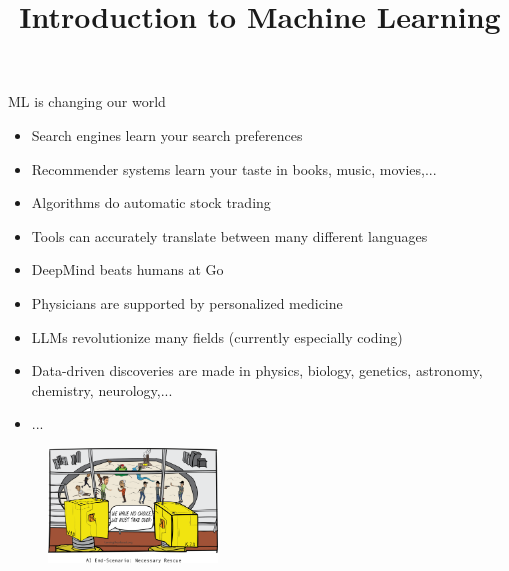 \documentclass[11pt,compress,t,notes=noshow, xcolor=table]{beamer}
\title{Introduction to Machine Learning}
\begin{document}


\begin{frame}{ML is changing our world}
  
  \begin{itemize}
    
    \item Search engines learn your search preferences
    
    \item Recommender systems learn your taste in books, music, movies,...
    
    \item Algorithms do automatic stock trading
    
    
    \item Tools can accurately translate between many different languages
    
    \item DeepMind beats humans at Go
    
    \item Physicians are supported by personalized medicine
    
    \item LLMs revolutionize many fields (currently especially coding)
    
    \item Data-driven discoveries are made in physics, biology, genetics, 
    astronomy, chemistry, neurology,...
    
    \item ...
    
  \end{itemize}
  
  \begin{figure}
    \includegraphics[width=0.4\textwidth]{figure_man/ai_world_end} 
  \end{figure}
  
  
\end{frame}
\end{document}
